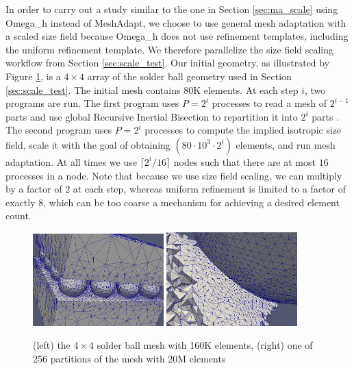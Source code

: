 In order to carry out a study similar to the one in Section \ref{sec:ma_scale}
using Omega\_h instead of MeshAdapt, we choose to use general mesh
adaptation with a scaled size field because Omega\_h does not use refinement
templates, including the uniform refinement template.
We therefore parallelize the size field scaling workflow from
Section \ref{sec:scale_test}.
Our initial geometry, as illustrated by Figure \ref{fig:osh_scale}, is
a $4\times 4$ array of the solder ball geometry used in Section \ref{sec:scale_test}.
The initial mesh contains 80K elements.
At each step $i$, two programs are run.
The first program uses $P=2^i$ processes to read a mesh of $2^{i-1}$
parts and use global Recursive Inertial Bisection to repartition it
into $2^i$ parts \cite{simon1991partitioning}.
The second program uses $P=2^i$ processes to compute the implied
isotropic size field, scale it with the goal of obtaining
$(80\cdot 10^3 \cdot 2^i)$ elements, and run mesh adaptation.
At all times we use $\lceil 2^i / 16 \rceil$ nodes such that there are
at most $16$ processes in a node.
Note that because we use size field scaling, we can multiply
by a factor of $2$ at each step, whereas uniform refinement
is limited to a factor of exactly $8$, which can be too coarse
a mechanism for achieving a desired element count.

\begin{figure}[t]\vspace*{4pt}
\centerline{
\includegraphics[width=0.45\textwidth]{sb_160k.png}
\includegraphics[width=0.45\textwidth]{sb_20480k_part40.png}
}
\caption{(left) the $4\times 4$ solder ball mesh with 160K elements,
(right) one of 256 partitions of the mesh with 20M elements}
\label{fig:osh_scale}
\end{figure}


